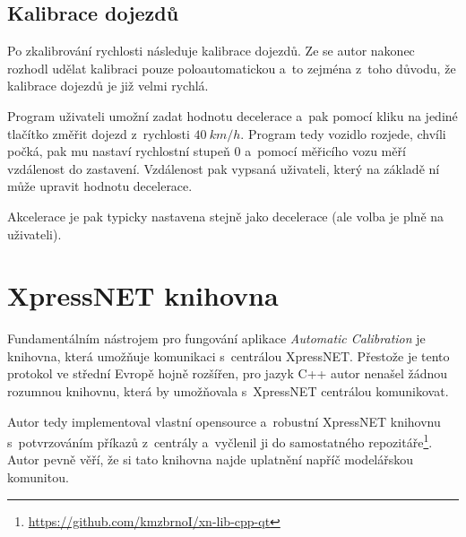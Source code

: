 \subsection{Kalibrace dojezdů}

Po zkalibrování rychlosti následuje kalibrace dojezdů. Ze se autor nakonec
rozhodl udělat kalibraci pouze poloautomatickou a~to zejména z~toho důvodu,
že kalibrace dojezdů je již velmi rychlá.

Program uživateli umožní zadat hodnotu decelerace a~pak pomocí kliku na jediné
tlačítko změřit dojezd z~rychlosti $40\ km/h$. Program tedy vozidlo rozjede,
chvíli počká, pak mu nastaví rychlostní stupeň $0$ a~pomocí měřicího vozu
měří vzdálenost do zastavení. Vzdálenost pak vypsaná uživateli, který na základě
ní může upravit hodnotu decelerace.

Akcelerace je pak typicky nastavena stejně jako decelerace (ale volba je plně
na uživateli).

\section{XpressNET knihovna}
\label{sec:xn-lib}

Fundamentálním nástrojem pro fungování aplikace \textit{Automatic Calibration}
je knihovna, která umožňuje komunikaci s~centrálou XpressNET. Přestože je tento
protokol ve střední Evropě hojně rozšířen, pro jazyk C++ autor nenašel žádnou
rozumnou knihovnu, která by umožňovala s~XpressNET centrálou komunikovat.

Autor tedy implementoval vlastní opensource a~robustní XpressNET knihovnu
s~potvrzováním příkazů z~centrály a~vyčlenil ji do samostatného
repozitáře\footnote{\url{https://github.com/kmzbrnoI/xn-lib-cpp-qt}}. Autor
pevně věří, že si tato knihovna najde uplatnění napříč modelářskou komunitou.

